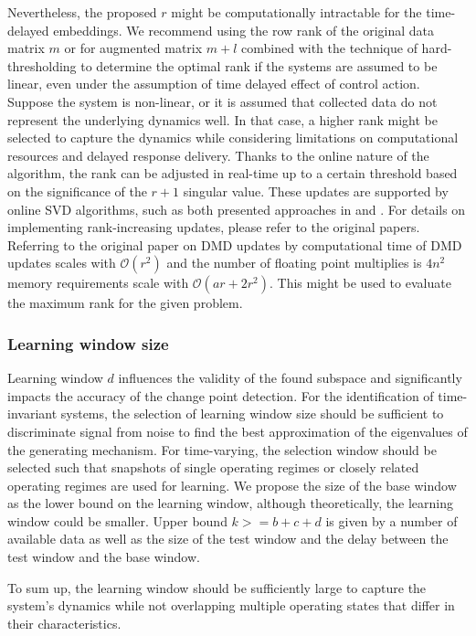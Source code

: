 Nevertheless, the proposed \( r \) might be computationally intractable for the time-delayed embeddings. We recommend using the row rank of the original data matrix \( m \) or for augmented matrix \( m + l \) combined with the technique of hard-thresholding to determine the optimal rank if the systems are assumed to be linear, even under the assumption of time delayed effect of control action. Suppose the system is non-linear, or it is assumed that collected data do not represent the underlying dynamics well. In that case, a higher rank might be selected to capture the dynamics while considering limitations on computational resources and delayed response delivery. Thanks to the online nature of the algorithm, the rank can be adjusted in real-time up to a certain threshold based on the significance of the \(r + 1 \) singular value. These updates are supported by online SVD algorithms, such as both presented approaches in \citet{Brand2006} and \citet{Zhang2022}. For details on implementing rank-increasing updates, please refer to the original papers. Referring to the original paper on DMD updates by \citet{Zhang2019} computational time of DMD updates scales with \( \mathcal{O}(r^2) \) and the number of floating point multiplies is \(4n^2\) memory requirements scale with \( \mathcal{O}(a r + 2 r ^ 2) \). This might be used to evaluate the maximum rank for the given problem.

\subsubsection{Learning window size}
Learning window \(d\) influences the validity of the found subspace and significantly impacts the accuracy of the change point detection. For the identification of time-invariant systems, the selection of learning window size should be sufficient to discriminate signal from noise to find the best approximation of the eigenvalues of the generating mechanism. For time-varying, the selection window should be selected such that snapshots of single operating regimes or closely related operating regimes are used for learning. We propose the size of the base window as the lower bound on the learning window, although theoretically, the learning window could be smaller. Upper bound \(k >= b + c + d\) is given by a number of available data as well as the size of the test window and the delay between the test window and the base window.

To sum up, the learning window should be sufficiently large to capture the system's dynamics while not overlapping multiple operating states that differ in their characteristics.

